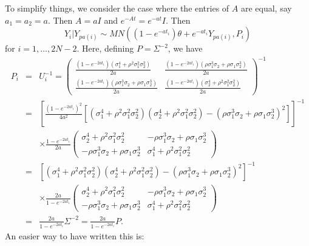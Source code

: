 \documentclass[12pt]{article}
\begin{document}
To simplify things, we consider the case where the entries of $A$ are equal, say $a_1 = a_2 = a$.  Then 
$A = aI$ and $e^{-At} = e^{-at}I$. 
Then
\begin{equation}
Y_i | Y_{pa(i)} \sim MN \left(( 1 - e^{-at_i} ) \theta + e^{-at_i}Y_{pa(i)},  P_i \right) 
\end{equation}
for $i = 1, \dots, 2N-2$.  Here, defining $P = \Sigma^{-2}$, we have
\begin{eqnarray*}
P_i & = &  U_i^{-1} =  \left( \begin{array}{cc}
\frac{(1- e^{-2a t_i}) (\sigma_1^4 + \rho^2 \sigma_1^2 \sigma_2^2 ) }{2 a} & \frac{(1 - e^{-2a t_i}) (\rho \sigma_1^3 \sigma_2 + \rho \sigma_1 \sigma_2^3) }{2a}  \\
\frac{(1 - e^{ -2a t_i}) (\rho \sigma_1^3 \sigma_2 + \rho \sigma_1 \sigma_2^3) }{2a} & \frac{ (1 - e^{-2 a t_i}) (\sigma_2^4 + \rho^2 \sigma_1^2 \sigma_2^2 ) }{2 a}  \end{array} \right) ^{-1} \\
& = & \left[ \frac{(1-e^{-2a t_i})^2}{4a^2} \left[ (\sigma_1^4 + \rho^2 \sigma_1^2 \sigma_2^2 )(\sigma_2^4 + \rho^2 \sigma_1^2 \sigma_2^2 )  
- (\rho \sigma_1^3 \sigma_2 + \rho \sigma_1 \sigma_2^3)^2 \right]   \right]^{-1} \\
& & \times \frac{1-e^{-2at_i}}{2a}
\left( \begin{array}{cc}
\sigma_2^4 + \rho^2 \sigma_1^2 \sigma_2^2   & - \rho \sigma_1^3 \sigma_2 + \rho \sigma_1 \sigma_2^3  \\
- \rho \sigma_1^3 \sigma_2 + \rho \sigma_1 \sigma_2^3 & \sigma_1^4 + \rho^2 \sigma_1^2 \sigma_2^2   \end{array} \right) \\
& = & \left[ (\sigma_1^4 + \rho^2 \sigma_1^2 \sigma_2^2 )(\sigma_2^4 + \rho^2 \sigma_1^2 \sigma_2^2 )  
- (\rho \sigma_1^3 \sigma_2 + \rho \sigma_1 \sigma_2^3)^2 \right]^{-1} \\
& & \times \frac{2a}{1-e^{-2at_i}}
\left( \begin{array}{cc}
\sigma_2^4 + \rho^2 \sigma_1^2 \sigma_2^2   & - \rho \sigma_1^3 \sigma_2 + \rho \sigma_1 \sigma_2^3  \\
- \rho \sigma_1^3 \sigma_2 + \rho \sigma_1 \sigma_2^3 & \sigma_1^4 + \rho^2 \sigma_1^2 \sigma_2^2   \end{array} \right)  \\
& = & \frac{2a}{1-e^{-2at_i}} \Sigma^{-2} = \frac{2a}{1-e^{-2at_i}} P .
\end{eqnarray*}
An easier way to have written this is:
\end{document}

